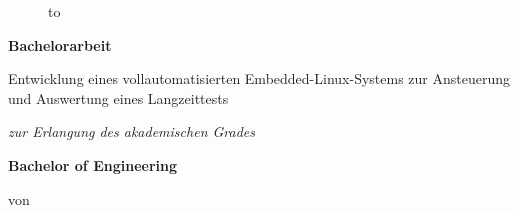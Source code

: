 \begin{titlepage}
	\begin{large}
		\begin{figure}
		  \begin{center}
		    \hbox to 
		  \end{center}
		\end{figure}
		
		\begin{center}
			\rule{0pt}{0pt}
			
			\vfill
			
			\begin{Huge}
			 \textbf{Bachelorarbeit}
			\end{Huge}
			
			\vfill
			
			\begin{LARGE}
				Entwicklung eines vollautomatisierten Embedded-Linux-Systems zur Ansteuerung und Auswertung eines Langzeittests\par
			\end{LARGE}
			
			\vfill
			\vfill
			
			\begin{Large}
			 \emph{zur Erlangung des akademischen Grades}
			\end{Large}
			
			\begin{LARGE}
			 \textbf{Bachelor of Engineering}
			\end{LARGE}
			
			\vfill
			
			von\\
			
			\vspace{.5cm}
			

\end{center}
\end{large}
\end{titlepage}
